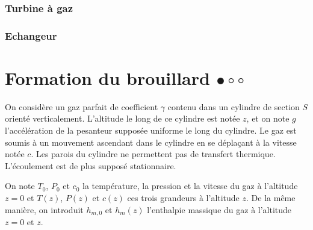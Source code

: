 \subsubsection*{Turbine à gaz}

\subsubsection*{Echangeur}

\newpage

\section{Formation du brouillard $\bullet\circ\circ$}

On considère un gaz parfait de coefficient $\gamma$ contenu dans un cylindre de section $S$ orienté verticalement. L'altitude le long de ce cylindre est notée $z$, et on note $g$ l'accélération de la pesanteur supposée uniforme le long du cylindre. Le gaz est soumis à un mouvement ascendant dans le cylindre en se déplaçant à la vitesse notée $c$. Les parois du cylindre ne permettent pas de transfert thermique. L'écoulement est de plus supposé stationnaire.

On note $T_0$, $P_0$ et $c_0$ la température, la pression et la vitesse du gaz à l'altitude $z=0$ et $T(z)$, $P(z)$ et $c(z)$ ces trois grandeurs à l'altitude $z$. De la même manière, on introduit $h_{m,0}$ et $h_m(z)$ l'enthalpie massique du gaz à l'altitude $z=0$ et $z$.

